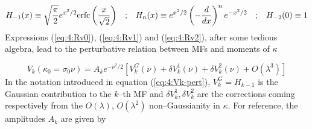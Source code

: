 \begin{equation}
\label{eq:4:hermite}
\begin{matrix}
\displaystyle H_{-1}(x) \equiv \sqrt{\frac{\pi}{2}}e^{x^2/2}{\rm erfc}\left(\frac{x}{\sqrt{2}}\right) & ; & \displaystyle H_n(x) \equiv e^{x^2/2}\left(-\frac{d}{dx}\right)^n e^{-x^2/2} & ; & H_{-2}(0)\equiv 1 
\end{matrix}
\end{equation}
%
Expressions (\ref{eq:4:Rv0}), (\ref{eq:4:Rv1}) and (\ref{eq:4:Rv2}), after some tedious algebra, lead to the perturbative relation between MFs and moments of $\kappa$

\begin{equation}
\label{eq:4:Vk-pert}
V_k(\kappa_0=\sigma_0\nu) = A_k e^{-\nu^2/2}\left[V_k^G(\nu)+\delta V^1_k(\nu) + \delta V^2_k(\nu) + O(\lambda^3)\right] 
\end{equation}
%
In the notation introduced in equation (\ref{eq:4:Vk-pert}), $V_k^G=H_{k-1}$ is the Gaussian contribution to the $k$--th MF and $\delta V^1_k,\delta V^2_k$ are the corrections coming respectively from the $O(\lambda)$, $O(\lambda^2)$ non--Gaussianity in $\kappa$. For reference, the amplitudes $A_k$ are given by 

